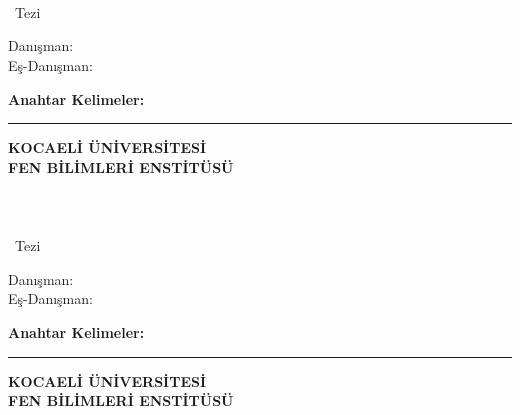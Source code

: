 \chapter*{\tabstract}

\begin{center}
{\bfseries \Large\titleTR}

\student

\departmentTR \\ {\tdegree~Tezi}

Danışman: \advisorTR \\
\ifnum{}
Eş-Danışman: \coadvisorTR
\fi  


\end{center}

\abstractTextTurkish

{\bfseries Anahtar Kelimeler:} \abstractKeywordsTurkish

\vfill


\begin{center}
\rule{0.8\textwidth}{.1pt}

\bfseries \small
 KOCAELİ ÜNİVERSİTESİ\\
 FEN BİLİMLERİ ENSTİTÜSÜ
\end{center}

\else
\newpage
\chapter*{\tabstract}

\begin{center}
{\bfseries \Large\titleTR}

\student

\departmentTR \\ {\tdegree~Tezi}

Danışman: \advisorTR \\
Eş-Danışman: \coadvisorTR

\end{center}

\abstractTextTurkish

{\bfseries Anahtar Kelimeler:} \abstractKeywordsTurkish

\vfill


\begin{center}
\rule{0.8\textwidth}{.1pt}

\bfseries \small
 KOCAELİ ÜNİVERSİTESİ\\
 FEN BİLİMLERİ ENSTİTÜSÜ
\end{center}

